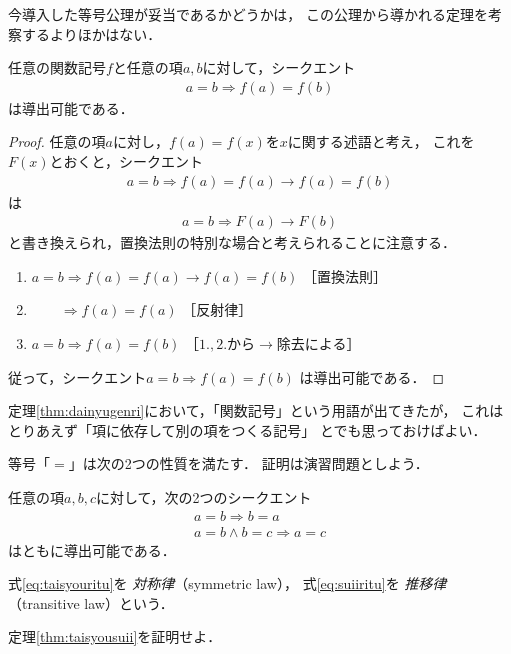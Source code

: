    今導入した等号公理が妥当であるかどうかは，
   この公理から導かれる定理を考察するよりほかはない．
   \begin{thm}[代入原理] \label{thm:dainyugenri}
     任意の関数記号$f$と任意の項$a,  b$に対して，シークエント
     \begin{align}
       a=b \Longrightarrow  f(a)=f(b)
       \label{eq:dainyu}
     \end{align}
     は導出可能である．
   \end{thm}
   \begin{proof}
     任意の項$a$に対し，$f(a)=f(x)$を$x$に関する述語と考え，
     これを$F(x)$とおくと，シークエント
     \begin{align*}
       a = b \Longrightarrow f(a)=f(a) \to f(a)=f(b)
     \end{align*}
     は
     \begin{align*}
       a=b \Longrightarrow F(a) \to F(b)
     \end{align*}
     と書き換えられ，置換法則の特別な場合と考えられることに注意する．
     \begin{enumerate}[1. ]
       \item $a=b \Longrightarrow f(a)=f(a) \to f(a) = f(b)$ \quad ［置換法則］
       \item $\qquad \Longrightarrow f(a)=f(a)$ \quad ［反射律］
       \item $a=b \Longrightarrow f(a) = f(b) $ \quad ［$1., 2.$から$\to$除去による］
     \end{enumerate}
     従って，シークエント$a=b \Longrightarrow f(a) = f(b)$
     は導出可能である．
   \end{proof}
   定理\ref{thm:dainyugenri}において，「関数記号」という用語が出てきたが，
   これはとりあえず「項に依存して別の項をつくる記号」
   とでも思っておけばよい．

   等号「$=$」は次の2つの性質を満たす．
   証明は演習問題としよう．
   \begin{thm} \label{thm:taisyousuii}
     任意の項$a,  b,  c$に対して，次の2つのシークエント
     \begin{align}
       a = b \Longrightarrow b = a 
       \label{eq:taisyouritu} \\
       a =b \land b=c \Longrightarrow a =c
       \label{eq:suiiritu}
     \end{align}
     はともに導出可能である．
     \end{thm}
     式\eqref{eq:taisyouritu}を
     \emph{対称律}（symmetric law），
     式\eqref{eq:suiiritu}を
     \emph{推移律}（transitive law）という．
     \begin{que} \label{que:taisyousuii}
       定理\ref{thm:taisyousuii}を証明せよ．
     \end{que}

